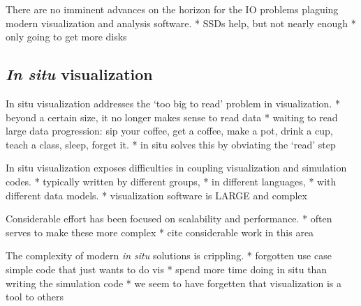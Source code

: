 
There are no imminent advances on the horizon for the IO problems
plaguing modern visualization and analysis software.
	* SSDs help, but not nearly enough
	* only going to get more disks

\subsection{\textit{In situ} visualization}

In situ visualization addresses the `too big to read' problem in
visualization.
	* beyond a certain size, it no longer makes sense to read data
  * waiting to read large data progression: sip your coffee, get a
  coffee, make a pot, drink a cup, teach a class, sleep, forget it.
	* in situ solves this by obviating the `read' step

In situ visualization exposes difficulties in coupling visualization
and simulation codes.
	* typically written by different groups,
	* in different languages,
	* with different data models.
	* visualization software is LARGE and complex

Considerable effort has been focused on scalability and performance.
	* often serves to make these more complex
	* cite considerable work in this area

The complexity of modern \textit{in situ} solutions is crippling.
	* forgotten use case simple code that just wants to do vis
	* spend more time doing in situ than writing the simulation code
	* we seem to have forgetten that visualization is a tool to others

